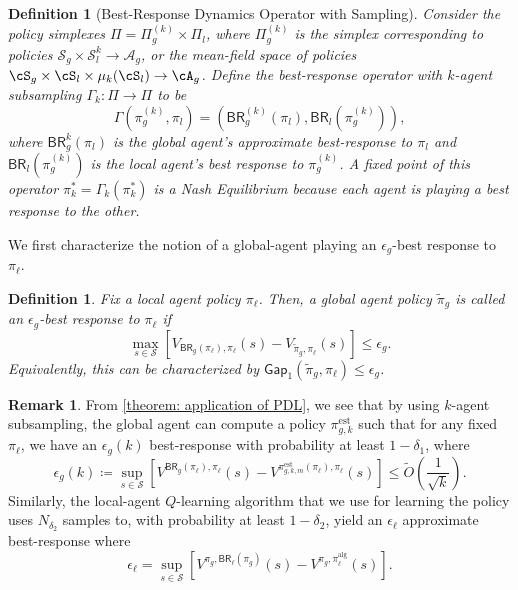 \documentclass{article}
\theoremstyle{plain}
\theoremstyle{definition}
\newtheorem{definition}[theorem]{Definition}
\newtheorem{remark}[theorem]{Remark}
\begin{document}
\begin{definition}[Best-Response Dynamics Operator with Sampling] \emph{Consider the policy simplexes $\Pi = \Pi_g^{(k)}\times\Pi_l$, where $\Pi_g^{(k)}$ is the simplex corresponding to policies $\mathcal{S}_g\times\mathcal{S}_l^k \to \mathcal{A}_g$, or the mean-field space of policies $\cS_g \times \cS_l \times \mu_k{(\cS_l)} \to \cA_g$. Define the best-response operator with $k$-agent subsampling $\Gamma_k:\Pi\to \Pi$ to be \begin{equation}\Gamma(\pi^{(k)}_g, \pi_l) = (\mathsf{BR}^{(k)}_g(\pi_l), \mathsf{BR}_l(\pi_g^{(k)})),
\end{equation}
where $\mathsf{BR}^k_g(\pi_l)$ is the global agent's approximate best-response to $\pi_l$ and $\mathsf{BR}_l(\pi^{(k)}_g)$ is the local agent's best response to $\pi^{(k)}_g$. A fixed point of this operator $\pi_k^* = \Gamma_k(\pi_k^*)$ is a Nash Equilibrium because each agent is playing a best response to the other.}\\
\end{definition}

We first characterize the notion of a global-agent playing an $\epsilon_g$-best response to $\pi_\ell$.
\begin{definition}
    \emph{Fix a local agent policy $\pi_\ell$. Then, a global agent policy $\tilde{\pi}_g$ is called an $\epsilon_g$-best response to $\pi_\ell$ if 
    \begin{equation}\max_{s\in \mathcal{S}} \left[V_{\mathsf{BR}_g(\pi_\ell),\pi_\ell}(s) - V_{\tilde{\pi}_g, \pi_\ell}(s)\right] \leq \epsilon_g.\end{equation}
    Equivalently, this can be characterized by $\mathsf{Gap}_1(\tilde{\pi}_g, \pi_\ell) \leq \epsilon_g$.}
\end{definition}

\begin{remark}From \cref{theorem: application of PDL}, we see that by using $k$-agent subsampling, the global agent can compute a policy $\pi_{g,k}^{\mathrm{est}}$ such that for any fixed $\pi_\ell$, we have an $\epsilon_g(k)$ best-response with probability at least $1 - \delta_1$, where
\begin{equation}\epsilon_g(k)\coloneqq \sup_{s\in \mathcal{S}}\left[V^{\mathsf{BR}_g(\pi_\ell),\pi_\ell}(s) - V^{\pi_{g,k,m}^{\mathrm{est}}(\pi_\ell),\pi_\ell}(s)\right] \leq  \tilde{O}\left(\frac{1}{\sqrt{k}}\right).\end{equation}
Similarly, the local-agent $Q$-learning algorithm that we use for learning the policy uses $N_{\delta_2}$ samples to, with probability at least $1-\delta_2$, yield an $\epsilon_\ell$ approximate best-response where 
\begin{equation}\epsilon_\ell = \sup_{s\in \mathcal{S}}\left[V^{\pi_g, \mathsf{BR}_\ell(\pi_g)}(s) - V^{\pi_g, \pi_\ell^{\mathrm{alg}}}(s)\right].\end{equation}
\end{remark}
\end{document}
